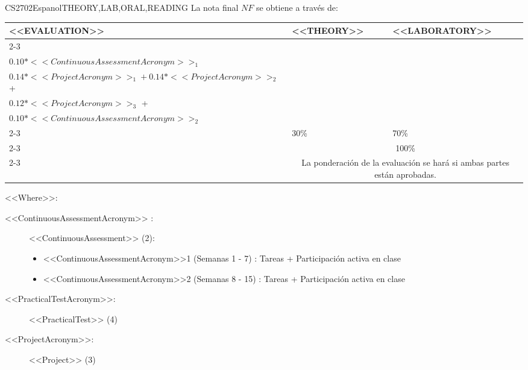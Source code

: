   \begin{evaluation}{CS2702}{Espanol}{THEORY,LAB,ORAL,READING}
  La nota final $NF$ se obtiene a través de:

  \begin{tabularx}{0.9\textwidth}{|X|p{}|p{}|} \hline
  \multirow{4}{*}{\uppercase{<<Evaluation>>}} & \uppercase{<<Theory>>} & \uppercase{<<Laboratory>>} \\ \cline{2-3}
  & %
      \begin{minipage}{0.95\textwidth}
      \begin{tabular}{l}
          $0.10*<<PracticalTestAcronym>>_{1} + 0.10*<<PracticalTestAcronym>>_{2}$ + \\  
          $0.10*<<ContinuousAssessmentAcronym>>_{1}$
      \end{tabular} 
      \end{minipage} 
  & %
      \begin{minipage}{0.95\textwidth}
      \begin{tabular}{l}
          $0.10*<<PracticalTestAcronym>>_{3} + 0.10*<<PracticalTestAcronym>>_{4}$ + \\ 
          $0.14*<<ProjectAcronym>>_{1} + 0.14*<<ProjectAcronym>>_{2}$  +\\
          $0.12*<<ProjectAcronym>>_{3}$ +\\
          $0.10*<<ContinuousAssessmentAcronym>>_{2}$
          \end{tabular} 
      \end{minipage}                 \\ \cline{2-3}
  
  & %
  30\% 
  & %
  70\% \\ \cline{2-3}
  & \multicolumn{2}{|c|}{100\%}  \\ \cline{2-3}
  & \multicolumn{2}{|c|}{La ponderación de la evaluación se hará si ambas partes están aprobadas.}  \\ \hline
  \end{tabularx}
  
  \vspace{2mm}
  \noindent <<Where>>:
  \begin{description}
    \item[<<ContinuousAssessmentAcronym>> :] <<ContinuousAssessment>> (2):
      \begin{itemize}
             \item  <<ContinuousAssessmentAcronym>>1 (Semanas 1 - 7) : Tareas + Participación activa en clase
              \item <<ContinuousAssessmentAcronym>>2 (Semanas 8 - 15) : Tareas + Participación activa en clase
       \end{itemize}
    \item[<<PracticalTestAcronym>>:] <<PracticalTest>> (4)
    \item[<<ProjectAcronym>>:] <<Project>> (3)    
  \end{description}
  

\end{evaluation}
